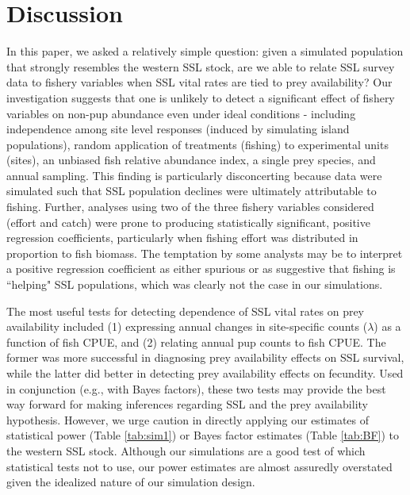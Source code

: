 \documentclass[11pt]{article}
\begin{document}
\section{Discussion}

In this paper, we asked a relatively simple question: given a simulated population that strongly resembles the western SSL stock, are we able to relate SSL survey data to fishery variables when SSL vital rates are tied to prey availability? Our investigation suggests that one is unlikely to detect a significant effect of fishery variables on non-pup abundance even under ideal conditions - including independence among site level responses (induced by simulating island populations), random application of treatments (fishing) to experimental units (sites), an unbiased fish relative abundance index, a single prey species, and annual sampling.  This finding is particularly disconcerting because data were simulated such that SSL population declines were ultimately attributable to fishing.  Further, analyses using two of the three fishery variables considered (effort and catch) were prone to producing statistically significant, positive regression coefficients, particularly when fishing effort was distributed in proportion to fish biomass.  The temptation by some analysts may be to interpret a positive regression coefficient as either spurious or as suggestive that fishing is ``helping" SSL populations, which was clearly not the case in our simulations.

The most useful tests for detecting dependence of SSL vital rates on prey availability included (1) expressing annual changes in site-specific counts ($\lambda$) as a function of fish CPUE, and (2) relating annual pup counts to fish CPUE.  The former was more successful in diagnosing prey availability effects on SSL survival, while the latter did better in detecting prey availability effects on fecundity.  Used in conjunction (e.g., with Bayes factors), these two tests may provide the best way forward for making inferences regarding SSL and the prey availability hypothesis.  However, we urge caution in directly applying our estimates of statistical power (Table \ref{tab:sim1}) or Bayes factor estimates (Table \ref{tab:BF}) to the western SSL stock.  Although our simulations are a good test of which statistical tests not to use, our power estimates are almost assuredly overstated given the idealized nature of our simulation design.
\end{document}

